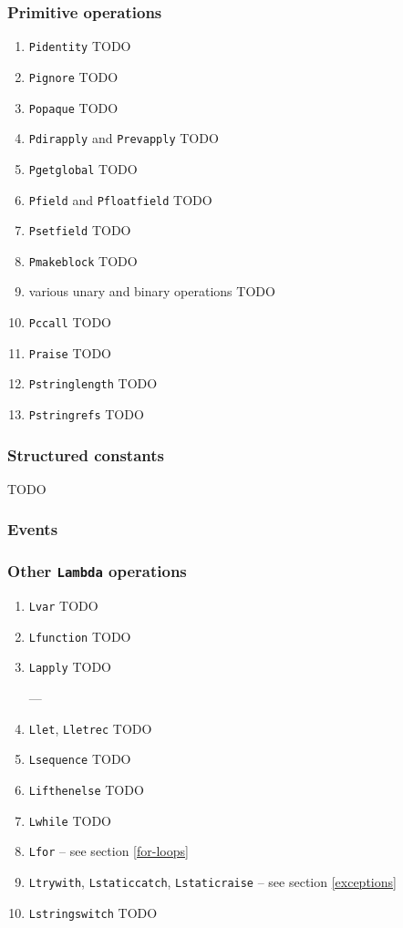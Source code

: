 \documentclass[12pt,a4paper,twoside,openright]{report}
\begin{document}
\subsubsection{Primitive operations}

\begin{enumerate}
  \item \lstinline!Pidentity! TODO
  \item \lstinline!Pignore! TODO
  \item \lstinline!Popaque! TODO
  \item \lstinline!Pdirapply! and \lstinline!Prevapply! TODO
  \item \lstinline!Pgetglobal! TODO
  \item \lstinline!Pfield! and \lstinline!Pfloatfield! TODO
  \item \lstinline!Psetfield! TODO
  \item \lstinline!Pmakeblock! TODO
  \item various unary and binary operations TODO
  \item \lstinline!Pccall! TODO
  \item \lstinline!Praise! TODO
  \item \lstinline!Pstringlength! TODO
  \item \lstinline!Pstringrefs! TODO
\end{enumerate}

\subsubsection{Structured constants}

TODO

\subsubsection{Events}

\subsubsection{Other \texttt{Lambda} operations}

\begin{enumerate}
  \item \lstinline!Lvar! TODO
  \item \lstinline!Lfunction! TODO
  \item \lstinline!Lapply! TODO

    ---

  \item \lstinline!Llet!, \lstinline!Lletrec! TODO
  \item \lstinline!Lsequence! TODO
  \item \lstinline!Lifthenelse! TODO
  \item \lstinline!Lwhile! TODO
  \item \lstinline!Lfor! -- see section \ref{for-loops}
  \item \lstinline!Ltrywith!, \lstinline!Lstaticcatch!, \lstinline!Lstaticraise! -- see section \ref{exceptions}
  \item \lstinline!Lstringswitch! TODO
\end{enumerate}
\end{document}
